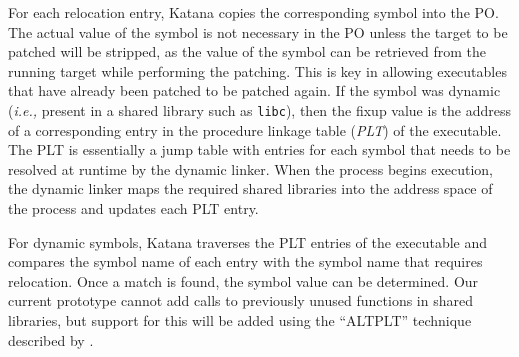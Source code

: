 For each relocation entry, Katana copies the corresponding symbol into
the PO. The actual value of the symbol is not necessary in the PO
unless the target to be patched will be stripped, as the value of the
symbol can be retrieved from the running target while performing the
patching. This is key in allowing executables that have already been
patched to be patched again.
If the symbol was
dynamic ({\it i.e.,} present in a shared library such as {\tt libc}),
then the fixup value is the address of a corresponding entry in the
procedure linkage table ({\it PLT}) of the executable.  The PLT is
essentially a jump table with entries for each symbol that needs to be
resolved at runtime by the dynamic linker.  When the process begins
execution, the dynamic linker maps the required shared libraries into
the address space of the process and updates each PLT entry.

For dynamic symbols, Katana traverses the PLT entries of the
executable and compares the symbol name of each entry with
the symbol name that requires relocation. Once a match is found, the
symbol value can be determined. Our current prototype cannot add calls
to previously unused functions in shared libraries, but support for
this will be added using the ``ALTPLT'' technique described by \cite{elf-debugging}.


